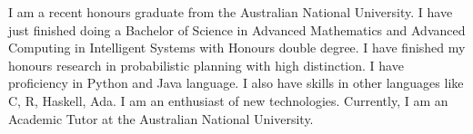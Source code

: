 

\begin{cvparagraph}

I am a recent honours graduate from the Australian National University. I have just finished doing a Bachelor of Science in Advanced Mathematics and Advanced Computing in Intelligent Systems with Honours double degree. I have finished my honours research in probabilistic planning with high distinction. I have proficiency in Python and Java language. I also have skills in other languages like C, R, Haskell, Ada. I am an enthusiast of new technologies. Currently, I am an Academic Tutor at the Australian National University.
\end{cvparagraph}
